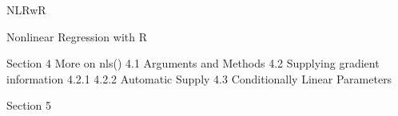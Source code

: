 NLRwR

Nonlinear Regression with R


Section 4 More on nls()
4.1 Arguments and Methods
4.2 Supplying gradient information
4.2.1
4.2.2 Automatic Supply
4.3 Conditionally Linear Parameters

Section 5
